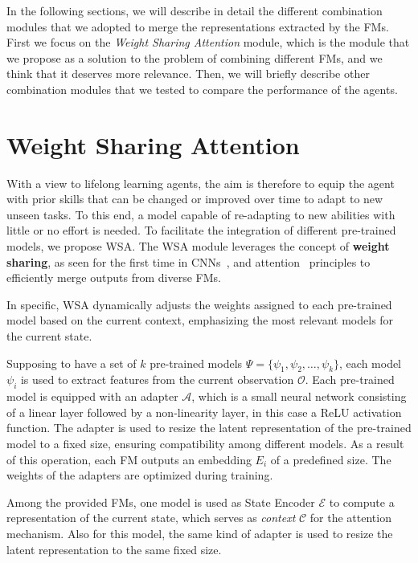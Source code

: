 In the following sections, we will describe in detail the different combination modules that we adopted to merge the representations extracted by the FMs.
First we focus on the \textit{Weight Sharing Attention} module, which is the module that we propose as a solution to the problem of combining different FMs, and we think that it deserves more relevance.
Then, we will briefly describe other combination modules that we tested to compare the performance of the agents.

\section{Weight Sharing Attention}
\label{sec:wsa}
With a view to lifelong learning agents, the aim is therefore to equip the agent with prior skills that can be changed or improved over time to adapt to new unseen tasks.
To this end, a model capable of re-adapting to new abilities with little or no effort is needed.
To facilitate the integration of different pre-trained models, we propose WSA\@.
The WSA module leverages the concept of \textbf{weight sharing}, as seen for the first time in CNNs~\citep{fukushima1980neocognitron}, and attention~\citep{vaswani2017attention} principles to efficiently merge outputs from diverse FMs.

In specific, WSA dynamically adjusts the weights assigned to each pre-trained model based on the current context, emphasizing the most relevant models for the current state.

Supposing to have a set of $k$ pre-trained models $\Psi = \{\psi_1, \psi_2, \ldots, \psi_k\}$, each model $\psi_i$ is used to extract features from the current observation $\mathcal{O}$.
Each pre-trained model is equipped with an adapter $\mathcal{A}$, which is a small neural network consisting of a linear layer followed by a non-linearity layer, in this case a ReLU activation function.
The adapter is used to resize the latent representation of the pre-trained model to a fixed size, ensuring compatibility among different models.
As a result of this operation, each FM outputs an embedding $E_i$ of a predefined size.
The weights of the adapters are optimized during training.

Among the provided FMs, one model is used as State Encoder $\mathcal{E}$ to compute a representation of the current state, which serves as \textit{context} $\mathcal{C}$ for the attention mechanism.
Also for this model, the same kind of adapter is used to resize the latent representation to the same fixed size.



